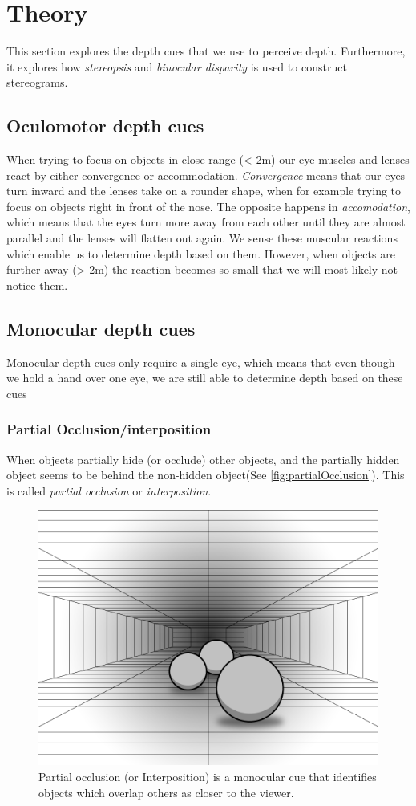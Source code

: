 \section{Theory}
This section explores the depth cues that we use to perceive depth. Furthermore, it explores how \textit{stereopsis} and \textit{binocular disparity} is used to construct stereograms.

\subsection{Oculomotor depth cues}
When trying to focus on objects in close range (< 2m) our eye muscles and lenses react by either convergence or accommodation. \textit{Convergence} means that our eyes turn inward and the lenses take on a rounder shape, when for example trying to focus on objects right in front of the nose. The opposite happens in \textit{accomodation}, which means that the eyes turn more away from each other until they are almost parallel and the lenses will flatten out again. We sense these muscular reactions which enable us to determine depth based on them. However, when objects are further away (> 2m) the reaction becomes so small that we will most likely not notice them\citep[p.~196]{sensationPerception}.

\subsection{Monocular depth cues}
Monocular depth cues only require a single eye, which means that even though we hold a hand over one eye, we are still able to determine depth based on these cues\citep[p.~197]{sensationPerception}

\subsubsection{Partial Occlusion/interposition}
When objects partially hide (or occlude) other objects, and the partially hidden object seems to be behind the non-hidden object(See \autoref{fig:partialOcclusion}). This is called \textit{partial occlusion} or \textit{interposition}\citep[p.~197]{sensationPerception}.

\begin{figure}[H]
	\centering
	\includegraphics[width=0.6\linewidth]{figure/Analysis/partialOcclusion.png}
	\caption{Partial occlusion (or Interposition) is a monocular cue that identifies objects which overlap others as closer to the viewer.}
	\label{fig:partialOcclusion}
\end{figure}

